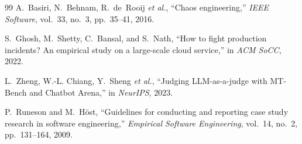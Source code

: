 \documentclass[conference]{IEEEtran}
\begin{document}
\begin{thebibliography}{99}
A.~Basiri, N.~Behnam, R.~de~Rooij \emph{et al.}, ``Chaos engineering,''
\emph{IEEE Software}, vol.~33, no.~3, pp.~35--41, 2016.

S.~Ghosh, M.~Shetty, C.~Bansal, and S.~Nath, ``How to fight production
incidents? An empirical study on a large-scale cloud service,'' in \emph{ACM
SoCC}, 2022.

L.~Zheng, W.-L. Chiang, Y.~Sheng \emph{et al.}, ``Judging LLM-as-a-judge with
MT-Bench and Chatbot Arena,'' in \emph{NeurIPS}, 2023.

P.~Runeson and M.~H\"{o}st, ``Guidelines for conducting and reporting case
study research in software engineering,'' \emph{Empirical Software
Engineering}, vol.~14, no.~2, pp.~131--164, 2009.

\end{thebibliography}
\end{document}
